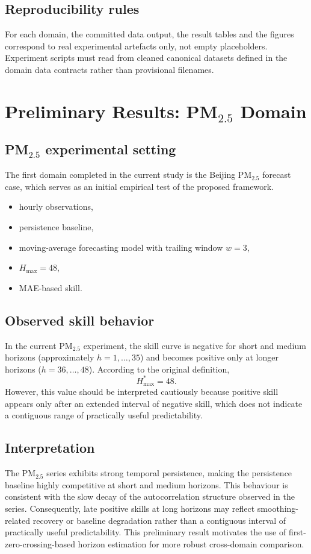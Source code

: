 \documentclass[11pt]{article}
\begin{document}
\subsection{Reproducibility rules}
For each domain, the committed data output, the result tables and the figures correspond to real experimental artefacts only, not empty placeholders.
Experiment scripts must read from cleaned canonical datasets defined in the domain data contracts rather than provisional filenames.

\section{Preliminary Results: PM$_{2.5}$ Domain}

\subsection{PM$_{2.5}$ experimental setting}
The first domain completed in the current study is the Beijing PM$_{2.5}$ forecast case, which serves as an initial empirical test of the proposed framework.
\begin{itemize}
  \item hourly observations,
  \item persistence baseline,
  \item moving-average forecasting model with trailing window $w=3$,
  \item $H_{\max}=48$,
  \item MAE-based skill.
\end{itemize}

\subsection{Observed skill behavior}
In the current PM$_{2.5}$ experiment, the skill curve is negative for short and medium horizons (approximately $h=1,\dots,35$) and becomes positive only at longer horizons ($h=36,\dots,48$).
According to the original definition,
\begin{equation}
H^*_{\max}=48.
\end{equation}
However, this value should be interpreted cautiously because positive skill appears only after an extended interval of negative skill, which does not indicate a contiguous range of practically useful predictability.

\subsection{Interpretation}
The PM$_{2.5}$ series exhibits strong temporal persistence, making the persistence baseline highly competitive at short and medium horizons.
This behaviour is consistent with the slow decay of the autocorrelation structure observed in the series.
Consequently, late positive skills at long horizons may reflect smoothing-related recovery or baseline degradation rather than a contiguous interval of practically useful predictability.
This preliminary result motivates the use of first-zero-crossing-based horizon estimation for more robust cross-domain comparison.
\end{document}
